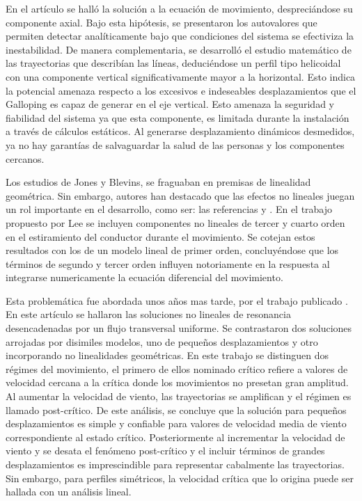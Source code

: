 En el artículo \cite{jones1992coupled} se halló la solución a la ecuación de movimiento, despreciándose su componente axial. Bajo esta hipótesis, se presentaron los autovalores que permiten detectar analíticamente bajo que condiciones del sistema se efectiviza la inestabilidad. De manera complementaria, se desarrolló el estudio matemático de las trayectorias que describían las líneas, deduciéndose un perfil tipo helicoidal con una componente vertical significativamente mayor a la horizontal. Esto indica la potencial amenaza respecto a los excesivos e indeseables desplazamientos que el Galloping es capaz de generar en el eje vertical. Esto amenaza la seguridad y fiabilidad del sistema ya que esta componente, es limitada durante la instalación a través de cálculos estáticos. Al generarse desplazamiento dinámicos desmedidos, ya no hay garantías de salvaguardar la salud de las personas y los componentes cercanos. 

Los estudios de Jones y Blevins,  se fraguaban en premisas de linealidad geométrica. Sin embargo, autores han destacado que las efectos no lineales juegan un rol importante en el desarrollo, como ser: las referencias \cite{luongo1984planar} y \cite{lee1992nonlinear}. En el trabajo propuesto por Lee se incluyen componentes no lineales de tercer y cuarto orden en el estiramiento del conductor durante el movimiento. Se cotejan estos resultados con los de un modelo lineal de primer orden, concluyéndose que los términos de segundo y tercer orden influyen notoriamente en la respuesta al integrarse numericamente la ecuación diferencial del movimiento. 

Esta problemática fue abordada unos años mas tarde, por el trabajo publicado \cite{luongo1998non}. En este artículo se hallaron las soluciones no lineales de resonancia desencadenadas por un flujo transversal uniforme. 
Se contrastaron dos soluciones arrojadas por disimiles modelos, uno de pequeños desplazamientos y otro incorporando no linealidades geométricas. En este trabajo se distinguen dos régimes del movimiento, el primero de ellos nominado crítico refiere a valores de velocidad cercana a la crítica donde los movimientos no presetan gran amplitud. Al aumentar la velocidad de viento, las trayectorias se amplifican y el régimen es llamado post-crítico. De este análisis, se concluye que la solución para pequeños desplazamientos es simple y confiable para valores de velocidad media de viento correspondiente al estado crítico. Posteriormente al incrementar la velocidad de viento y se desata el fenómeno post-crítico y el incluir términos de grandes desplazamientos es imprescindible para representar cabalmente las trayectorias. Sin embargo, para perfiles simétricos, la velocidad crítica que lo origina puede ser hallada con un análisis lineal.

